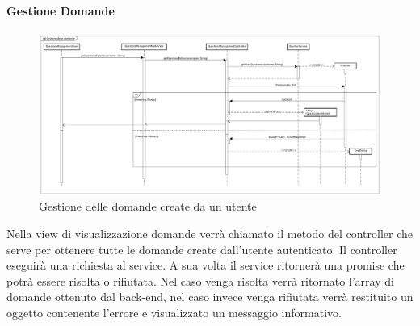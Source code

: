 \paragraph{Gestione Domande}

\label{Gestione delle domande create da un utente}

\begin{figure}[ht]
	\centering
	\includegraphics[scale=0.25,keepaspectratio]{UML/DiagrammiDiSequenza/Front-end/QuestionsManagement.png}
	\caption{Gestione delle domande create da un utente}
\end{figure} \FloatBarrier

Nella view di visualizzazione domande verrà chiamato il metodo del controller che serve per ottenere tutte le domande create dall'utente autenticato. Il controller eseguirà una richiesta al service. A sua volta il service ritornerà una promise che potrà essere risolta o rifiutata. Nel caso venga risolta verrà ritornato l'array di domande ottenuto dal back-end, nel caso invece venga rifiutata verrà restituito un oggetto contenente l'errore e visualizzato un messaggio informativo. 